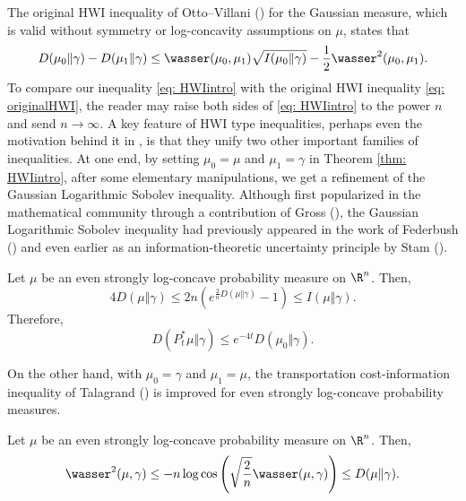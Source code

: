 The original HWI inequality of Otto--Villani (\cite[Theorem 3]{OttoVillani00}) for the Gaussian measure, which is valid without symmetry or log-concavity assumptions on $\mu$, states that
\begin{equation} \label{eq: originalHWI}
D(\mu_{0} \Vert \gamma) - D(\mu_{1} \Vert \gamma) \leq \wasser (\mu_{0}, \mu_{1}) \sqrt{I(\mu_{0} \Vert \gamma)} - \frac{1}{2} \wasser^{2} (\mu_{0}, \mu_{1}).
\end{equation}
To compare our inequality \eqref{eq: HWIintro} with the original HWI inequality \eqref{eq: originalHWI}, the reader may raise both sides of \eqref{eq: HWIintro} to the power $n$ and send $n \to \infty$. A key feature of HWI type inequalities, perhaps even the motivation behind it in \cite{OttoVillani00}, is that they unify two other important families of inequalities. At one end, by setting $\mu_{0} = \mu$ and $\mu_{1} = \gamma$ in Theorem \ref{thm: HWIintro}, after some elementary manipulations, we get a refinement of the Gaussian Logarithmic Sobolev inequality. Although first popularized in the mathematical community through a contribution of Gross (\cite{Gross75}), the Gaussian Logarithmic Sobolev inequality had previously appeared in the work of Federbush (\cite{Federbush69}) and even earlier as an information-theoretic uncertainty principle by Stam (\cite{Stam59}). 
 \begin{cor} 
     Let $\mu$ be an even strongly log-concave probability measure on $\R^n$. Then, 
     \begin{equation}
4 D(\mu \Vert \gamma) \leq 2n \left( e^{\frac{2}{n}D(\mu \Vert \gamma)} - 1 \right) \leq I( \mu \Vert \gamma).
       \end{equation}
       Therefore, 
       \begin{equation}
 D(P^{\ast}_{t} \mu \Vert \gamma ) \leq e^{-4t} D(\mu_{0} \Vert \gamma).
       \end{equation}
 \end{cor}
On the other hand, with $\mu_{0} = \gamma$ and $\mu_{1} = \mu$, the transportation cost-information inequality of Talagrand (\cite{Talagrand96}) is improved for even strongly log-concave probability measures.
\begin{cor} 
    Let $\mu$ be an even strongly log-concave probability measure on $\R^n$. Then,
        \begin{equation}
\wasser^{2} (\mu , \gamma) \leq - n \log \cos \left( \sqrt{\frac{2}{n}} \wasser(\mu, \gamma) \right) \leq D(\mu \Vert \gamma).
        \end{equation}
\end{cor}
